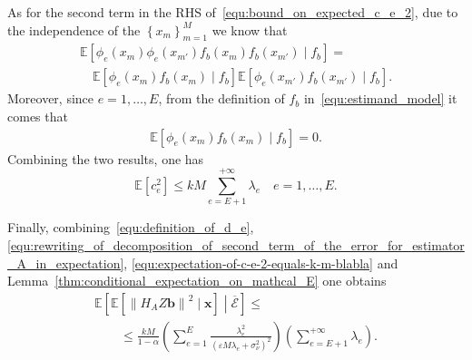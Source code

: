 \documentclass[10pt,twocolumn,twoside]{IEEEtran}					%
\theoremstyle	{plain}
\newcommand{\Expectation}					[0]	{\mathbb{E}}
\newcommand{\ExpectationOf}					[1]	{\Expectation \left[ #1 \right]}
\newcommand{\ExpectationOfGiven}			[2]	{\ExpectationOf{ #1 \; \left| \; #2 \right. }}
\newcommand	{\Lemma}				[0]	{Lemma}
\begin{document}
%
As for the second term in the \ac{RHS} of~\eqref{equ:bound_on_expected_c_e_2}, due to the independence of the $\left\{ x_{m} \right\}_{m = 1}^{M}$ we know that
%
\begin{equation}
	\begin{array}{l}
		\ExpectationOfGiven{\phi_{e} \left( x_{m} \right)
			\phi_{e} \left( x_{m'} \right)
			f_{b} \left( x_{m} \right) 
			f_{b} \left( x_{m'} \right) }{f_{b}}
		= \\ \quad \displaystyle
		\ExpectationOfGiven{\phi_{e} \left( x_{m} \right)
			f_{b} \left( x_{m} \right) }{f_{b}}
		\ExpectationOfGiven{\phi_{e} \left( x_{m'} \right)
			f_{b} \left( x_{m'} \right)}{f_{b}}.
	\end{array}
\end{equation}
%
Moreover, since $e = 1, \ldots, E$, from the definition of $f_{b}$ in~\eqref{equ:estimand_model} it comes that 
%
\begin{equation}
	\begin{array}{l}
	\ExpectationOfGiven{ \phi_{e} \left( x_{m} \right) f_{b} \left( x_{m} \right) }{f_{b}} = 0.
	\end{array}
\end{equation}
%
Combining the two results, one has
%
\begin{equation}
	\ExpectationOf{ c_{e}^{2} }
	\leq
	k M \sum_{e = E + 1}^{+ \infty} \lambda_{e}
	\quad e = 1, \ldots, E .
	\label{equ:expectation-of-c-e-2-equals-k-m-blabla}
\end{equation}

Finally, combining~\eqref{equ:definition_of_d_e}, \eqref{equ:rewriting_of_decomposition_of_second_term_of_the_error_for_estimator_A_in_expectation}, \eqref{equ:expectation-of-c-e-2-equals-k-m-blabla} and \Lemma~\ref{thm:conditional_expectation_on_mathcal_E} one obtains
\vspace{0.2cm}
%
\begin{equation}
	\begin{array}{l}
		\displaystyle
		\ExpectationOfGiven{\ExpectationOfGiven{\left\| H_{A} Z \bm{b} \right\|^{2}}{\bm{x}}}{\overline{\mathcal{E}}} \leq \\
		\qquad \leq \displaystyle
		\frac{k M}{1-\alpha}
		\left(
			\sum_{e = 1}^{E}
			\frac{\lambda^2_{e}}{(\varepsilon M \lambda_e + \sigma^{2}_{\nu})^2}
		\right)
		\left(
			\sum_{e = E + 1}^{+\infty} \lambda_{e}
		\right) .
	\end{array}
	\label{equ:second_MSE_term_for_estimator_A}
\end{equation}
\end{document}
